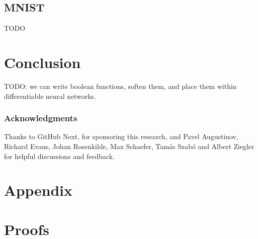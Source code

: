 \documentclass{article} %
\begin{document}
\subsection{MNIST}

TODO

\section{Conclusion}

TODO: we can write boolean functions, soften them, and place them within differentiable neural networks.

\subsubsection*{Acknowledgments}
Thanks to GitHub Next, for sponsoring this research, and Pavel Augustinov, Richard Evans, Johan Rosenkilde, Max Schaefer, Tam\'{a}s Szab\'{o} and Albert Ziegler for helpful discussions and feedback.




\newpage

\appendix

\section*{Appendix}

\section{Proofs}
\end{document}
